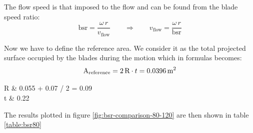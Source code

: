 \documentclass[a4paper,12pt]{article}
\begin{document}
The flow speed is that imposed to the flow and can be found from the blade speed ratio:
\begin{equation}
\text{bsr} = \dfrac{\omega \, r}{v_\text{flow}} \quad \quad \Rightarrow \quad \quad v_\text{flow} = \dfrac{\omega \, r}{\text{bsr} }
\end{equation}

Now we have to define the reference area. We consider it as the total projected surface occupied by the blades during the motion which in formulas becomes:
\begin{equation}
\text{A}_\text{reference} = 2\, \text{R} \cdot t = 0.0396 \,\text{m}^2
\end{equation}
\begin{conditions}
R & 0.055 + 0.07 / 2 = 0.09 \m  {} \\
t & 0.22 \m {}
\end{conditions}

The results plotted in figure \ref{fig:bsr-comparison-80-120} are then shown in table \ref{table:bsr80}
\end{document}
